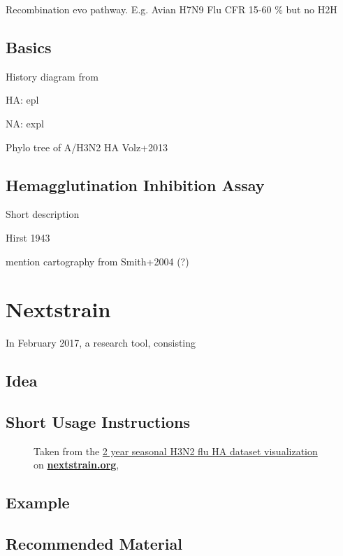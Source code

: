 \documentclass[12pt]{scrartcl}
\newcommand{\red}[1]{{\color{red}#1}}
\begin{document}
\red{Recombination evo pathway. E.g. Avian H7N9 Flu CFR 15-60 \% but no H2H}


  \subsection{Basics}

    History diagram from \citep{alberts15}

    HA: epl

    NA: expl

    Phylo tree of A/H3N2 HA Volz+2013

  \subsection{Hemagglutination Inhibition Assay}

    Short description

    Hirst 1943

    mention cartography from Smith+2004 (?) 

\section{Nextstrain} \label{nextstrain}

  In February 2017, a research tool, consisting

  \subsection{Idea}

  \subsection{Short Usage Instructions}
  \begin{figure}[h!]
    \caption{\footnotesize Taken from the \href{https://nextstrain.org/flu/seasonal/h3n2/ha/2y?p=grid}{2 year seasonal H3N2 flu HA dataset visualization} on \href{https://nextstrain.org}{\textbf{nextstrain.org}}, \cite{leeMoncla+20}}
  \end{figure}


  \subsection{Example}

  \subsection{Recommended Material}
\end{document}

